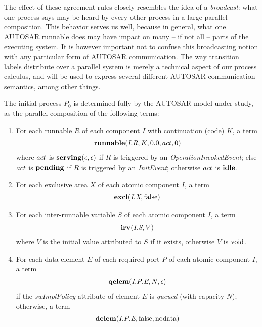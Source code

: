 \documentclass[twocolumn]{article}
\begin{document}
The effect of these agreement rules closely resembles the idea of a \emph{broadcast}: what one process says may be heard by every other process in a large parallel composition. This behavior serves us well, because in general, what one AUTOSAR runnable does may have impact on many -- if not all -- parts of the executing system. It is however important not to confuse this broadcasting notion with any particular form of AUTOSAR communication. The way transition labels distribute over a parallel system is merely a technical aspect of our process calculus, and will be used to express several different AUTOSAR communication semantics, among other things.

The initial process $P_0$ is determined fully by the AUTOSAR model under study, as the parallel composition of the following terms:
\begin{enumerate}

\item For each runnable $R$ of each component $I$ with continuation (code) $K$, a term
\[
\begin{array}{c}
	\Trunnable{\Tr{R}{I}}{K}{0.0}{\Act}{0}
\end{array}
\]
where $\Act$ is $\Tserving{\epsilon}{\epsilon}$ if $R$ is triggered by an \emph{OperationInvokedEvent}; else $\Act$ is $\Tpending$ if $R$ is triggered by an \emph{InitEvent}; otherwise $\Act$ is $\Tidle$.

\item For each exclusive area $X$ of each atomic component $I$, a term
\[
\begin{array}{c}
	\Texcl{\Tx{X}{I}}{\Tfalse}
\end{array}
\]

\item For each inter-runnable variable $S$ of each atomic component $I$, a term
\[
\begin{array}{c}
	\Tirv{\Ts{S}{I}}{V}
\end{array}
\]
where $V$ is the initial value attributed to $S$ if it exists, otherwise $V$ is $\Tvoid$.

\item For each data element $E$ of each required port $P$ of each atomic component $I$, a term
\[
\begin{array}{c}
	\Tqelem{\Tep{E}{P}{I}}{N}{\epsilon}
\end{array}
\]
if the \emph{swImplPolicy} attribute of element $E$ is \emph{queued} (with capacity $N$); otherwise, a term
\[
\begin{array}{c}
	\Tdelem{\Tep{E}{P}{I}}{\Tfalse}{\text{nodata}}
\end{array}
\]


\end{enumerate}
\end{document}
